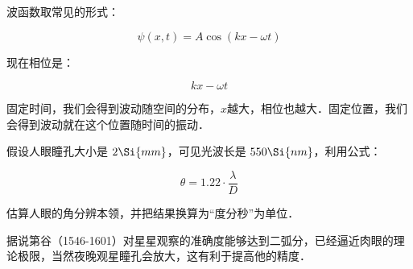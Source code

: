 波函数取常见的形式：

\begin{equation}
\psi (x,t )= A \cos \left( k x - \omega t \right)
\end{equation}

现在相位是：

\begin{equation}
k x - \omega t
\end{equation}

固定时间，我们会得到波动随空间的分布，$x$越大，相位也越大．固定位置，我们会得到波动就在这个位置随时间的振动．

\begin{exercise}{}
假设人眼瞳孔大小是 $2\Si{mm}$，可见光波长是 $550\Si{nm}$，利用公式：

\begin{equation}
\theta = 1.22 \cdot \frac{\lambda}{D}
\end{equation}

估算人眼的角分辨本领，并把结果换算为“度分秒”为单位．

据说第谷（1546-1601）对星星观察的准确度能够达到二弧分，已经逼近肉眼的理论极限，当然夜晚观星瞳孔会放大，这有利于提高他的精度．
\end{exercise}
